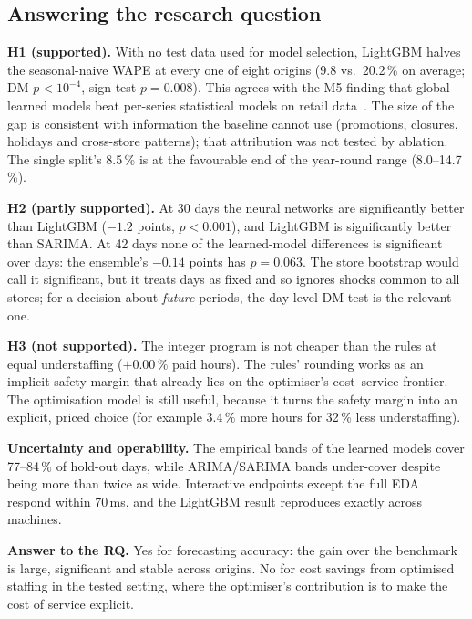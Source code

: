 \documentclass[conference]{IEEEtran}
\begin{document}
\subsection{Answering the research question}
\textbf{H1 (supported).} With no test data used for model selection, LightGBM halves the
seasonal-naive WAPE at every one of eight origins (9.8 vs.\ 20.2\,\% on average; DM $p<10^{-4}$, sign
test $p=0.008$). This agrees with the M5 finding that global learned models beat per-series
statistical models on retail data~\cite{makridakis2022m5}. The size of the gap is consistent with
information the baseline cannot use (promotions, closures, holidays and cross-store patterns); that
attribution was not tested by ablation. The single split's 8.5\,\% is at the favourable end of the
year-round range (8.0--14.7\,\%).

\textbf{H2 (partly supported).} At 30 days the neural networks are significantly better than LightGBM
($-1.2$ points, $p<0.001$), and LightGBM is significantly better than SARIMA. At 42 days none of the
learned-model differences is significant over days: the ensemble's $-0.14$ points has $p=0.063$. The
store bootstrap would call it significant, but it treats days as fixed and so ignores shocks common to
all stores; for a decision about \emph{future} periods, the day-level DM test is the relevant one.

\textbf{H3 (not supported).} The integer program is not cheaper than the rules at equal
understaffing ($+0.00\,\%$ paid hours). The rules' rounding works as an implicit safety margin that
already lies on the optimiser's cost--service frontier. The optimisation model is still useful,
because it turns the safety margin into an explicit, priced choice (for example 3.4\,\% more hours for
32\,\% less understaffing).

\textbf{Uncertainty and operability.} The empirical bands of the learned models cover 77--84\,\% of
hold-out days, while ARIMA/SARIMA bands under-cover despite being more than twice as wide. Interactive
endpoints except the full EDA respond within 70\,ms, and the LightGBM result reproduces exactly across
machines.

\textbf{Answer to the RQ.} Yes for forecasting accuracy: the gain over the benchmark is large,
significant and stable across origins. No for cost savings from optimised staffing in the tested
setting, where the optimiser's contribution is to make the cost of service explicit.
\end{document}
